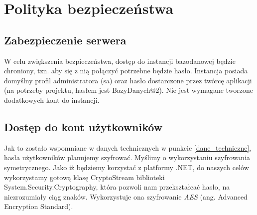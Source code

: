 \documentclass{article}
\begin{document}
\section{Polityka bezpieczeństwa}
\subsection{Zabezpieczenie serwera}
W celu zwiększenia bezpieczeństwa, dostęp do instancji bazodanowej będzie chroniony, tzn. aby się z nią połączyć potrzebne będzie hasło. Instancja posiada domyślny profil administratora (sa) oraz hasło dostarczone przez twórcę aplikacji (na potrzeby projektu, hasłem jest BazyDanych@2). Nie jest wymagane tworzone dodatkowych kont do instancji.
\subsection{Dostęp do kont użytkowników}
Jak to zostało wspomniane w danych technicznych w punkcie \ref{dane_techniczne}, hasła użytkowników planujemy szyfrować. Myślimy o wykorzystaniu szyfrowania symetrycznego. Jako iż będziemy korzystać z platformy .NET, do naszych celów wykorzystamy gotową klasę CryptoStream biblioteki System.Security.Cryptography, która pozwoli nam przekształcać hasło, na niezrozumiały ciąg znaków. Wykorzystuje ona szyfrowanie \textit{AES} (ang. Advanced Encryption Standard). 
\end{document}
